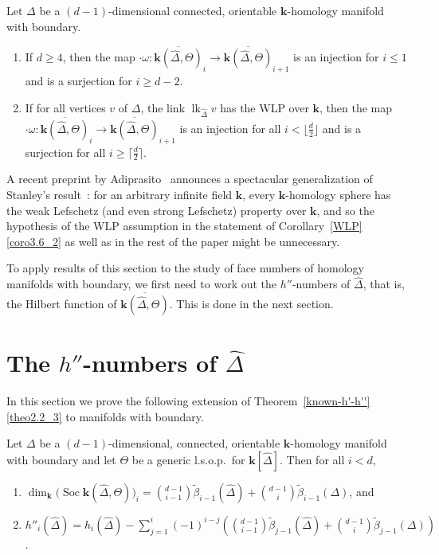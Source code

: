 \documentclass[ALCO,ThmDefs,Unicode,epreuves]{cedram}
\DeclareMathOperator\lk{lk}
\DeclareMathOperator{\Soc}{Soc}
\newcommand{\complet}[1]{\hat{#1}}
\newcommand{\field}{\mathbf{k}}
\begin{document}
\begin{coro} \label{WLP}
Let $\Delta$ be a $(d-1)$-dimensional connected, orientable $\field$-homology manifold with boundary. 
\begin{enumerate}
\item\label{coro3.6_1} If $d\geq 4$, then the map $\cdot \omega: \overline{\field(\complet{\Delta},\Theta)}_i \to \overline{\field(\complet{\Delta},\Theta)}_{i+1}$
is an injection for $i\leq 1$ and is a surjection for $i\geq d-2$.
\item\label{coro3.6_2} If for all vertices $v$ of $\Delta$, the link $\lk_{\complet{\Delta}}v$ has the WLP over $\field$, then the map 
$\cdot \omega: \overline{\field(\complet{\Delta},\Theta)}_i \to \overline{\field(\complet{\Delta},\Theta)}_{i+1}$ is an injection for all $i<\lfloor \frac{d}{2}\rfloor$ and is a surjection for all $i\geq \lceil \frac{d}{2}\rceil$.
\end{enumerate}
\end{coro}

\begin{rema} \label{rem:WLP}
A recent preprint by Adiprasito~\cite{Adiprasito-g} announces a spectacular generalization of Stanley's result~\cite{Stanley-80}: for an arbitrary infinite field $\field$, every $\field$-homology sphere has the weak Lefschetz (and even strong Lefschetz) property over $\field$, and so the hypothesis of the WLP assumption in the statement of Corollary~\ref{WLP}\eqref{coro3.6_2} as well as in the rest of the paper might be unnecessary.
\end{rema}

To apply results of this section to the study of face numbers of homology manifolds with boundary, we first need to work out the $h''$-numbers of $\complet{\Delta}$, that is, the Hilbert function of $\overline{\field(\complet{\Delta},\Theta)}$. This is done in the next section.

\section{The \texorpdfstring{$h''$}{h''}-numbers of  \texorpdfstring{$\hat{\Delta}$}{Delta}} \label{sec:h''-and-socles}
In this section we prove the following extension of Theorem~\ref{known-h'-h''}\eqref{theo2.2_3} to manifolds with boundary. 

\begin{theorem} \label{soc-and-h''}
Let $\Delta$ be a $(d-1)$-dimensional, connected, orientable $\field$-homology manifold with boundary and let $\Theta$ be a generic l.s.o.p.~for $\field[\complet{\Delta}]$. Then for all $i<d$,
\begin{enumerate}
\item\label{theo4.1_1} $\dim_\field \big(\Soc \field(\complet{\Delta},\Theta)\big)_i=\binom{d-1}{i-1}\tilde{\beta}_{i-1}(\complet{\Delta})+\binom{d-1}{i}\tilde{\beta}_{i-1}(\Delta)$, and
\item\label{theo4.1_2} $h''_i(\complet{\Delta})=h_i(\complet{\Delta})-\sum_{j=1}^{i}(-1)^{i-j}\left(\binom{d-1}{i-1}\tilde{\beta}_{j-1}(\complet{\Delta})+\binom{d-1}{i}\tilde{\beta}_{j-1}(\Delta)\right)$.
\end{enumerate}
\end{theorem}
\end{document}
